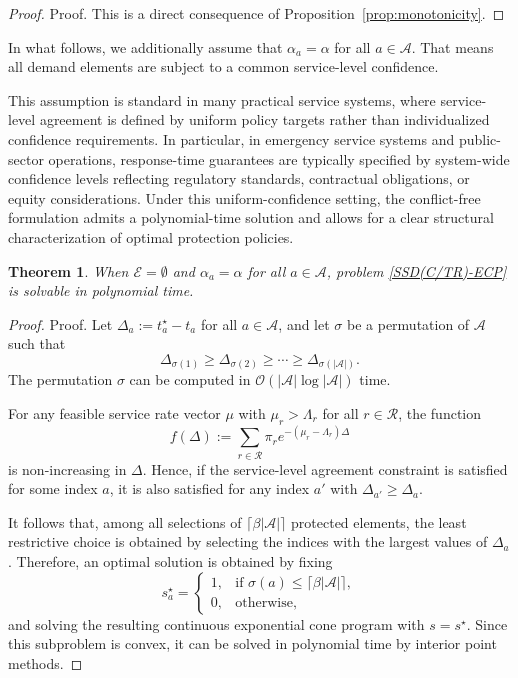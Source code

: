 \documentclass[letter,11pt, reqno]{amsart}
\newtheorem{theorem}{Theorem}
\begin{document}
\begin{proof}{Proof.}
This is a direct consequence of Proposition~\ref{prop:monotonicity}.%
\end{proof}

In what follows, we additionally assume that $\alpha_a=\alpha$ for all
$a\in\mathcal A$.
That means all demand elements are subject to a common service-level confidence.

This assumption is standard in many practical service systems, where
service-level agreement is defined by uniform policy targets rather than
individualized confidence requirements.
In particular, in emergency service systems and public-sector operations,
response-time guarantees are typically specified by system-wide confidence
levels reflecting regulatory standards, contractual obligations, or equity
considerations.
Under this uniform-confidence setting, the conflict-free formulation admits a
polynomial-time solution and allows for a clear structural characterization of
optimal protection policies.

\begin{theorem}
When $\mathcal E=\emptyset$ and $\alpha_a=\alpha$ for all $a\in\mathcal A$,
problem \ref{SSD(C/TR)-ECP} is solvable in polynomial time.
\end{theorem}

\begin{proof}{Proof.}
Let $\Delta_a:=t_a^\star-t_a$ for all $a\in\mathcal A$, and let $\sigma$ be a
permutation of $\mathcal A$ such that
$$
\Delta_{\sigma(1)} \ge \Delta_{\sigma(2)} \ge \cdots \ge \Delta_{\sigma(|\mathcal A|)}.
$$
The permutation $\sigma$ can be computed in
$\mathcal O(|\mathcal A|\log|\mathcal A|)$ time.

For any feasible service rate vector $\mu$ with $\mu_r>\Lambda_r$ for all
$r\in\mathcal R$, the function
$$
f(\Delta):=\sum_{r\in\mathcal R}\pi_r e^{-(\mu_r-\Lambda_r)\Delta}
$$
is non-increasing in $\Delta$.
Hence, if the service-level agreement constraint is satisfied for some index $a$,
it is also satisfied for any index $a'$ with $\Delta_{a'}\ge\Delta_a$.

It follows that, among all selections of
$\lceil\beta|\mathcal A|\rceil$ protected elements, the least restrictive choice
is obtained by selecting the indices with the largest values of $\Delta_a$.
Therefore, an optimal solution is obtained by fixing
$$
s^\star_a=
\begin{cases}
1, & \text{if } \sigma(a)\le \lceil\beta|\mathcal A|\rceil,\\
0, & \text{otherwise},
\end{cases}
$$
and solving the resulting continuous exponential cone program with $s=s^\star$.
Since this subproblem is convex, it can be solved in polynomial time by interior
point methods.%
\end{proof}
\end{document}
